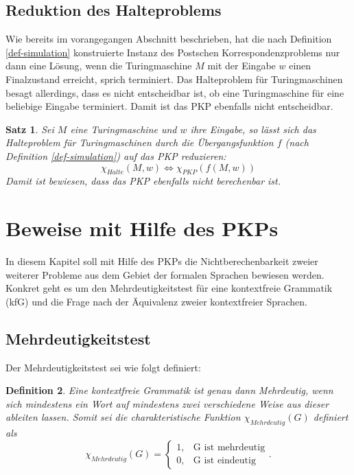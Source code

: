 \documentclass[]{scrartcl}
\newtheorem{definition}{Definition}[section]
\newtheorem{satz}[definition]{Satz}
\begin{document}
	\subsection{Reduktion des Halteproblems}
	
		Wie bereits im vorangegangen Abschnitt beschrieben, hat die nach Definition \ref{def-simulation} konstruierte Instanz des Postschen Korrespondenzproblems nur dann eine Lösung, wenn die Turingmaschine $M$ mit der Eingabe $w$ einen Finalzustand erreicht, sprich terminiert. Das Halteproblem für Turingmaschinen besagt allerdings, dass es nicht entscheidbar ist, ob eine Turingmaschine für eine beliebige Eingabe terminiert. Damit ist das PKP ebenfalls nicht entscheidbar.
		
		\begin{satz}
		Sei $M$ eine Turingmaschine und $w$ ihre Eingabe, so lässt sich das Halteproblem für Turingmaschinen durch die Übergangsfunktion $f$ (nach Definition \ref{def-simulation}) auf das PKP reduzieren:
		\[\chi_{Halte} (M, w) \Leftrightarrow \chi_{PKP}(f(M, w))\]
		Damit ist bewiesen, dass das PKP ebenfalls nicht berechenbar ist.
		\end{satz}

\section{Beweise mit Hilfe des PKPs}

	In diesem Kapitel soll mit Hilfe des PKPs die Nichtberechenbarkeit zweier weiterer Probleme aus dem Gebiet der formalen Sprachen bewiesen werden. Konkret geht es um den Mehrdeutigkeitstest für eine kontextfreie Grammatik (kfG) und die Frage nach der Äquivalenz zweier kontextfreier Sprachen.
	
	\subsection{Mehrdeutigkeitstest}
	\label{subsec-mehrdeutigkeit}
		
		Der Mehrdeutigkeitstest sei wie folgt definiert:
		\begin{definition}
			Eine kontextfreie Grammatik ist genau dann Mehrdeutig, wenn sich mindestens ein Wort auf mindestens zwei verschiedene Weise aus dieser ableiten lassen. Somit sei die charakteristische Funktion $\chi_{Mehrdeutig}(G)$ definiert als
			  \[
			     \chi_{Mehrdeutig}(G)=\left\{\begin{array}{ll} 1, & \text{G ist mehrdeutig} \\
			         0, &\text{G ist eindeutig}\end{array}\right. .
			  \]
		\end{definition}
		
\end{document}
